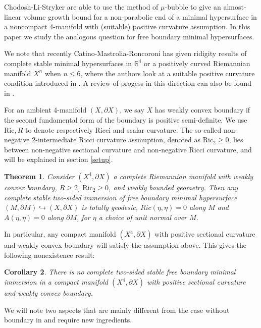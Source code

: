 \documentclass[12pt]{amsart}
\newcommand{\R}{\mathbb R}
\newcommand{\Ric}{\text{Ric}}
\newcommand{\p}{\partial}
\newtheorem{theorem}{Theorem}[section]
\newtheorem{corollary}[theorem]{Corollary}
\numberwithin{equation}{section}
\begin{document}
	Chodosh-Li-Stryker \cite{ChodoLiStryk2022-CompleteStableMinimal} are able to use the method of $\mu$-bubble to give an almost-linear volume growth bound for a non-parabolic end of a minimal hypersurface in a noncompact 4-manifold with (suitable) positive curvature assumption.
	In this paper we study the analogous question for free boundary minimal hypersurfaces.

	We note that recently Catino-Mastrolia-Roncoroni \cite{CatinMastrRonco2023-TwoRigidityResults} has given ridigity results of complete stable minimal hypersurfaces in $\R^4$ or a positively curved Riemannian manifold $X^n$ when $n\leq 6$, where the authors look at a suitable positive curvature condition introduced in \cite{ShenYe1996-StableMinimalSurfaces}. 
	A review of progess in this direction can also be found in \cite{ChodoLiStryk2022-CompleteStableMinimal}.

	For an ambient 4-manifold $(X,\p X)$, we say $X$ has weakly convex boundary if the second fundamental form of the boundary is positive semi-definite. We use $\Ric, R$ to denote respectively Ricci and scalar curvature.  The so-called non-negative 2-intermediate Ricci curvature assmuption, denoted as $\Ric_2 \geq 0$, lies between non-negative sectional curvature and non-negative Ricci curvature, and will be explained in section \ref{setup}.

	\begin{theorem}
		Consider $(X^4, \partial X)$ a complete Riemannian manifold with weakly convex boundary, $R \geq 2$, $\Ric_2 \geq 0$, and weakly bounded geometry. Then any complete stable two-sided immersion of free boundary minimal hypersurface $(M,\partial M)\hookrightarrow (X,\partial X)$ is totally geodesic, $Ric(\eta,\eta)=0$ along $M$ and $A(\eta,\eta)=0$ along $\p M$, for $\eta$ a choice of unit normal over $M$.
	\end{theorem}
	In particular, any compact manifold $(X^4,\p X)$ with positive sectional curvature and weakly convex boundary will satisfy the assumption above. This gives the following nonexistence result:
	\begin{corollary}
		There is no complete two-sided stable free boundary minimal immersion in  a compact manifold $(X^4,\p X)$ with positive sectional curvature and weakly convex boundary.
	\end{corollary}  
	We will note two aspects that are mainly different from the case without boundary in \cite{ChodoLiStryk2022-CompleteStableMinimal} and require new ingredients. 
\end{document}
